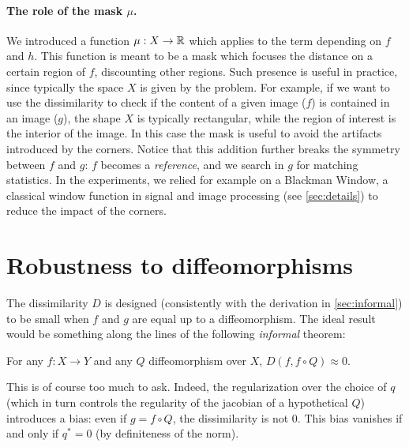\paragraph{The role of the mask $\mu$.} We introduced a function $\mu:X \to \mathbb R$ which applies to the term depending on $f$ and $h$. This function is meant to be a mask which focuses the distance on a certain region of $f$, discounting other regions. Such presence is useful in practice, since typically the space $X$ is given by the problem. For example, if we want to use the dissimilarity to check if the content of a given image ($f$) is contained in an image ($g$), the shape $X$ is typically rectangular, while the region of interest is the interior of the image. In this case the mask is useful to avoid the artifacts introduced by the corners. Notice that this addition further breaks the symmetry between $f$ and $g$: $f$ becomes a \emph{reference}, and we search in $g$ for matching statistics. In the experiments, we relied for example on a Blackman Window, a classical window function in signal and image processing (see \cref{sec:details}) to reduce the impact of the corners.




\section{Robustness to diffeomorphisms}\label{sec:robustness}


The dissimilarity $D$ is designed (consistently with the derivation in \cref{sec:informal}) to be small when $f$ and $g$ are equal up to a diffeomorphism. The ideal result would be something along the lines of the following \emph{informal} theorem:

\begin{theorem}[Ideal]\label{thm:ideal}
    For any $f: X \to Y$ and any $Q$ diffeomorphism over $X$, $D(f, f\circ Q) \approx 0.$
\end{theorem}

This is of course too much to ask. Indeed, the regularization over the choice of $q$ (which in turn controls the regularity of the jacobian of a hypothetical $Q$) introduces a bias:  even if $g = f \circ Q$, the dissimilarity is not $0$. This bias vanishes if and only if $q^*=0$ (by definiteness of the norm).

